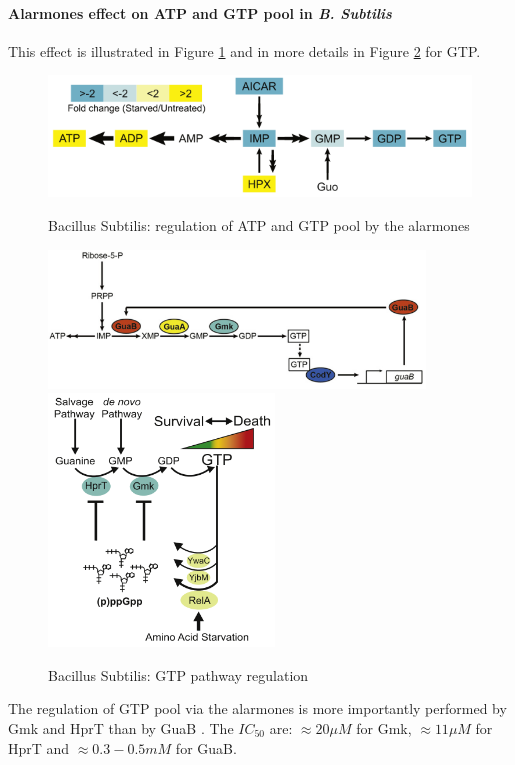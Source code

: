 \paragraph{Alarmones effect on ATP and GTP pool in \textit{B. Subtilis}}
This effect is illustrated in Figure \ref{fig:alarmoneEnergyReg} and in more details in Figure \ref{fig:alarmoneGTPReg} for GTP.
\begin{figure}[hbtp]
  \centering
  \includegraphics[width=15cm]{figure/alarmoneEnergy.png}\\
  \caption{Bacillus Subtilis: regulation of ATP and GTP pool by the alarmones \citep{kriel_direct_2012}}\label{fig:alarmoneEnergyReg}
\end{figure}
\begin{figure}[hbtp]
  \centering
  \includegraphics[width=10cm]{figure/alarmoneGTPPathway1.png} \\ \includegraphics[width=6cm]{figure/alarmoneGTPPathway2.png}\\
  \caption{Bacillus Subtilis: GTP pathway regulation \citep{kriel_direct_2012}}\label{fig:alarmoneGTPReg}
\end{figure}
The regulation of GTP pool via the alarmones is more importantly performed by Gmk and HprT than by GuaB \citep{kriel_direct_2012}. The $IC_{50}$ are: $\approx 20 \mu M$ for Gmk, $\approx 11 \mu M$ for HprT and $\approx 0.3-0.5 mM$ for GuaB.



